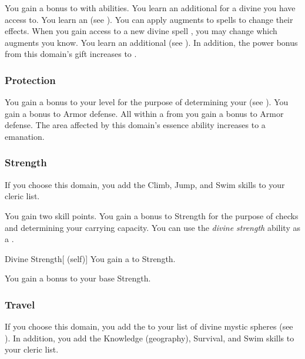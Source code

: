              You gain a  bonus to  with  abilities.
             You learn an additional  for a divine  you have access to.
             You learn an  (see ).
            You can apply augments to spells to change their effects.
            When you gain access to a new divine spell , you may change which augments you know.
             You learn an additional  (see ).
            In addition, the power bonus from this domain's gift increases to .

        \subsubsection{Protection}
             You gain a  bonus to your level for the purpose of determining your  (see ).
             You gain a  bonus to Armor defense.
             All  within a \areamed {} from you gain a  bonus to Armor defense.
             The area affected by this domain's essence ability increases to a \areahuge emanation.

        \subsubsection{Strength}
            If you choose this domain, you add the Climb, Jump, and Swim skills to your cleric  list.

             You gain two skill points.
             You gain a  bonus to Strength for the purpose of checks and determining your carrying capacity.
             You can use the \textit{divine strength} ability as a .
            \begin{attuneability}{Divine Strength}[ (self)]
                You gain a   to Strength.
            \end{attuneability}
             You gain a  bonus to your base Strength.

        \subsubsection{Travel}
            If you choose this domain, you add the   to your list of divine mystic spheres (see ).
            In addition, you add the Knowledge (geography), Survival, and Swim skills to your cleric  list.

